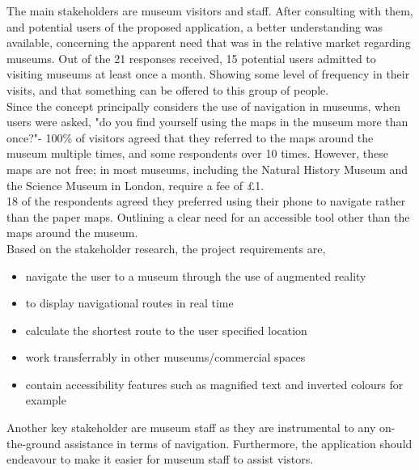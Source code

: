 
The main stakeholders are museum visitors and staff. After consulting with them, and potential users of the proposed application, a better understanding was available, concerning the apparent need that was in the relative market regarding museums. Out of the 21 responses received, 15 potential users admitted to visiting museums at least once a month. Showing some level of frequency in their visits, and that something can be offered to this group of people.\\

Since the concept principally considers the use of navigation in museums, when users were asked, "do you find yourself using the maps in the museum more than once?"- 100\% of visitors agreed that they referred to the maps around the museum multiple times, and some respondents over 10 times. However, these maps are not free; in most museums, including the Natural History Museum and the Science Museum in London, require a fee of £1.\\

18 of the respondents agreed they preferred using their phone to navigate rather than the paper maps. Outlining a clear need for an accessible tool other than the maps around the museum.\\

Based on the stakeholder research, the project requirements are, 

\begin{itemize}
    \item navigate the user to a museum through the use of augmented reality
    \item to display navigational routes in real time
    \item calculate the shortest route to the user specified location 
    \item work transferrably in other museums/commercial spaces
    \item contain accessibility features such as magnified text and inverted colours for example
\end{itemize}

Another key stakeholder are museum staff as they are instrumental to any on-the-ground assistance in terms of navigation. Furthermore, the application should endeavour to make it easier for museum staff to assist vistors.\\


